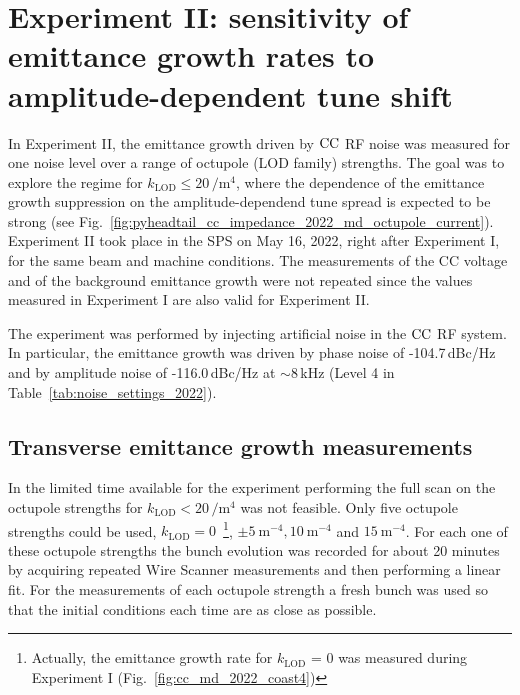 \section{Experiment II: sensitivity of emittance growth rates to amplitude-dependent tune shift}\label{subsec:cc_md_2022_octupole_scan}

In Experiment II, the emittance growth driven by ${\mathrm{CC}}$ RF noise was measured for one noise level over a range of octupole (LOD family) strengths. The goal was to explore the regime for $k_\mathrm{LOD} \leq 20$\,$\mathrm{/m^4}$, where the dependence of the emittance growth suppression on the amplitude-dependend tune spread is expected to be strong (see Fig.~\ref{fig:pyheadtail_cc_impedance_2022_md_octupole_current}). Experiment II took place in the SPS on May 16, 2022, right after Experiment I, for the same beam and machine conditions. The measurements of the CC voltage and of the background emittance growth were not repeated since the values measured in Experiment I are also valid for Experiment II.

The experiment was performed by injecting artificial noise in the ${\mathrm{CC}}$ RF system. In particular, the emittance growth was driven by phase noise of -104.7\,dBc/Hz and by amplitude noise of -116.0\,dBc/Hz at $\sim$8\,kHz (Level 4 in Table~\ref{tab:noise_settings_2022}). 



\subsection{Transverse emittance growth measurements}\label{subsec:emit_growth_exp2}

In the limited time available for the experiment performing the full scan on the octupole strengths for $k_\mathrm{LOD} < 20$\,$\mathrm{/m^4}$ was not feasible. Only five octupole strengths could be used, $k_\mathrm{LOD} = 0$~\footnote{Actually, the emittance growth rate for $k_\mathrm{LOD}$ = 0 was measured during Experiment I (Fig.~\ref{fig:cc_md_2022_coast4})}, $\pm 5 \ \mathrm{m^{-4}}, 10 \ \mathrm{m^{-4}}$ and $15 \ \mathrm{m^{-4}}$. %
For each one of these octupole strengths the bunch evolution was recorded for about 20 minutes by acquiring repeated Wire Scanner measurements and then performing a linear fit. For the measurements of each octupole strength a fresh bunch was used so that the initial conditions each time are as close as possible.



